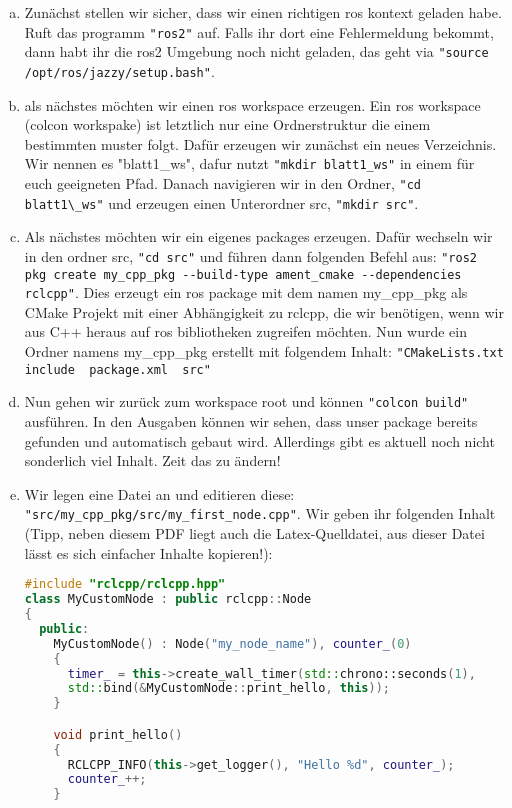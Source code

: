 \documentclass[a4paper,12pt]{article}
\begin{document}
\begin{enumerate}[a)]
\item{Zunächst stellen wir sicher, dass wir einen richtigen ros kontext geladen habe. Ruft das programm \lstinline{"ros2"} auf. Falls ihr dort eine Fehlermeldung bekommt, dann habt ihr die ros2 Umgebung noch nicht geladen, das geht via \lstinline{"source /opt/ros/jazzy/setup.bash"}.}
\item{als nächstes möchten wir einen ros workspace erzeugen. Ein ros workspace (colcon workspake) ist letztlich nur eine Ordnerstruktur die einem bestimmten muster folgt. Dafür erzeugen wir zunächst ein neues Verzeichnis. Wir nennen es "blatt1\_ws", dafur nutzt \lstinline{"mkdir blatt1_ws"} in einem für euch geeigneten Pfad. Danach navigieren wir in den Ordner, \lstinline{"cd blatt1\_ws"} und erzeugen einen Unterordner src, \lstinline{"mkdir src"}.}
\item{Als nächstes möchten wir ein eigenes packages erzeugen. Dafür wechseln wir in den ordner src, \lstinline{"cd src"} und führen dann folgenden Befehl aus: \lstinline{"ros2 pkg create my_cpp_pkg --build-type ament_cmake --dependencies rclcpp"}. Dies erzeugt ein ros package mit dem namen my\_cpp\_pkg als CMake Projekt mit einer Abhängigkeit zu rclcpp, die wir benötigen, wenn wir aus C++ heraus auf ros bibliotheken zugreifen möchten. Nun wurde ein Ordner namens my\_cpp\_pkg erstellt mit folgendem Inhalt: \lstinline{"CMakeLists.txt  include  package.xml  src"}}
\item{Nun gehen wir zurück zum workspace root und können \lstinline{"colcon build"} ausführen. In den Ausgaben können wir sehen, dass unser package bereits gefunden und automatisch gebaut wird. Allerdings gibt es aktuell noch nicht sonderlich viel Inhalt. Zeit das zu ändern!}
\item{Wir legen eine Datei an und editieren diese: \lstinline{"src/my_cpp_pkg/src/my_first_node.cpp"}. Wir geben ihr folgenden Inhalt (Tipp, neben diesem PDF liegt auch die Latex-Quelldatei, aus dieser Datei lässt es sich einfacher Inhalte kopieren!):

\begin{lstlisting}[language=C++,basicstyle=\fontsize{6.5}{8}\selectfont]
#include "rclcpp/rclcpp.hpp"
class MyCustomNode : public rclcpp::Node
{
  public:
    MyCustomNode() : Node("my_node_name"), counter_(0)
    {
      timer_ = this->create_wall_timer(std::chrono::seconds(1),
      std::bind(&MyCustomNode::print_hello, this));
    }

    void print_hello()
    {
      RCLCPP_INFO(this->get_logger(), "Hello %d", counter_);
      counter_++;
    }


\end{lstlisting}}
\end{enumerate}
\end{document}
